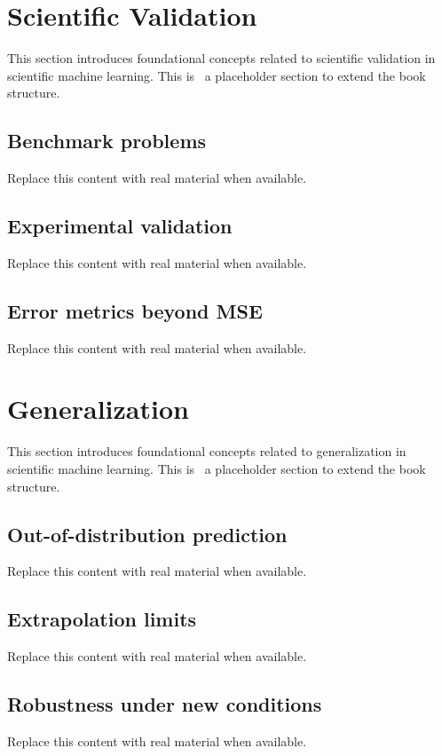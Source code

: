 
\section{Scientific Validation}
This section introduces foundational concepts related to scientific validation in scientific machine learning. This is~\cite{abdulmaksoudTransformerBasedSensorFusion2025} a placeholder section to extend the book structure.

\subsection{Benchmark problems}
Replace this content with real material when available.

\subsection{Experimental validation}
Replace this content with real material when available.

\subsection{Error metrics beyond MSE}
Replace this content with real material when available.

\section{Generalization}
This section introduces foundational concepts related to generalization in scientific machine learning. This is~\cite{abdulmaksoudTransformerBasedSensorFusion2025} a placeholder section to extend the book structure.

\subsection{Out-of-distribution prediction}
Replace this content with real material when available.

\subsection{Extrapolation limits}
Replace this content with real material when available.

\subsection{Robustness under new conditions}
Replace this content with real material when available.

